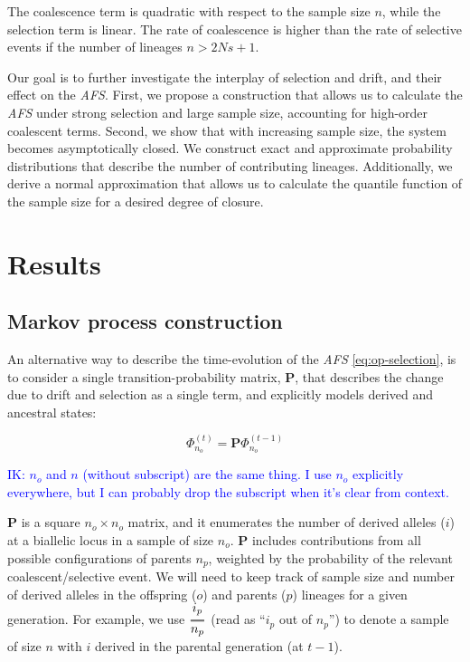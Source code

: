 \documentclass[review]{elsarticle}
\newcommand{\afs}[2]{\Phi_{#1}^{(#2)}}
\newcommand{\Dfrac}[2]{%
  \ooalign{%
    $\genfrac{}{}{1.2pt}0{#1}{#2}$\cr%
    $\color{white}\genfrac{}{}{.4pt}0{\phantom{#1}}{\phantom{#2}}$}%
}
\newcommand{\ikcomment}[1]{\textcolor{blue}{IK: #1}}
\begin{document}
The coalescence term is quadratic with respect to the sample size $n$, while the selection term is
linear. The rate of coalescence is higher than the rate of selective events if the number of
lineages $n>2Ns+1$.

Our goal is to further investigate the interplay of selection and drift, and their effect on the
\textit{AFS}. First, we propose a construction that allows us to calculate the \textit{AFS} under
strong selection and large sample size, accounting for high-order coalescent terms. Second, we show
that with increasing sample size, the system becomes asymptotically closed. We construct exact and
approximate probability distributions that describe the number of contributing lineages.
Additionally, we derive a normal approximation that allows us to calculate the quantile function of
the sample size for a desired degree of closure.


\section{Results}
\label{sec:results}

\subsection{Markov process construction}
\label{subsec:markov}

An alternative way to describe the time-evolution of the \textit{AFS} \eqref{eq:op-selection}, is to
consider a single transition-probability matrix, $\mathbf{P}$, that describes the change due to
drift and selection as a single term, and explicitly models derived and ancestral states:

\begin{equation}
  \label{eq:app:time-evolution}
  \afs{n_o}{t} = \mathbf{P} \afs{n_o}{t-1}
\end{equation}


\ikcomment{$n_o$ and $n$ (without subscript) are the same thing. I use $n_o$ explicitly everywhere,
  but I can probably drop the subscript when it's clear from context.}

$\mathbf{P}$ is a square $n_o \times n_o$ matrix, and it enumerates the number of derived alleles
($i$) at a biallelic locus in a sample of size $n_o$. $\mathbf{P}$ includes contributions from
all possible configurations of parents $n_p$, weighted by the probability of the relevant
coalescent/selective event. We will need to keep track of sample size and number of derived alleles
in the offspring ($o$) and parents ($p$) lineages for a given generation. For example, we use
$\Dfrac{i_p}{n_p}$ (read as ``$i_p$ out of $n_p$'') to denote a sample of size $n$ with $i$ derived in
the parental generation (at $t-1$).
\end{document}
